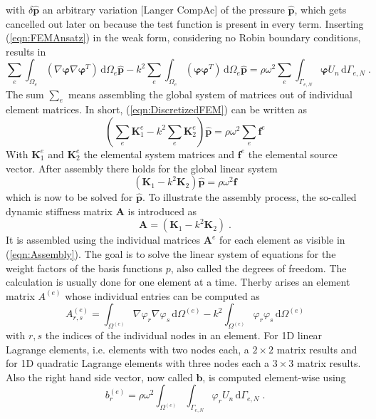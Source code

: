 \documentclass[%
  a4paper,oneside,%
  11pt,%
  smallchapters,
  green,%
  rgb, <cmyk>
  ]{tubsbook}
\begin{document}
with $\delta\hat{\bm{p}}$ an arbitrary variation [Langer CompAc] of the pressure $\hat{\bm{p}}$, which gets cancelled out later on because the test function is present in every term.
Inserting (\ref{eqn:FEMAnsatz}) in the weak form, considering no Robin boundary conditions, results in
\begin{equation}
\sum_e \int_{\Omega_e} (\nabla \bm{\varphi} \nabla \bm{\varphi}^T)\,\mathrm{d}\Omega_e \hat{\bm{p}} -k^2 \sum_e \int_{\Omega_e} (\bm{\varphi} \bm{\varphi}^T)\,\mathrm{d}\Omega_e \hat{\bm{p}} = \rho \omega^2 \sum_e \int_{\Gamma_{e,N}} \bm{\varphi} U_n \,\mathrm{d}\Gamma_{e,N} \;.
\label{eqn:DiscretizedFEM}
\end{equation}
The sum $\sum_e$ means assembling the global system of matrices out of individual element matrices. In short, (\ref{eqn:DiscretizedFEM}) can be written as
\begin{equation}
\left( \sum_e \bm{K}_1^e - k^2 \sum_e \bm{K}_2^e \right)\hat{\bm{p}} = \rho \omega^2 \sum_e \bm{f}^e
\end{equation}
With $\bm{K}_1^e$ and $\bm{K}_2^e$ the elemental system matrices and $\bm{f}^e$ the elemental source vector. After assembly there holds for the global linear system
\begin{equation}
(\bm{K}_1 - k^2 \bm{K}_2) \hat{\bm{p}} = \rho \omega^2 \bm{f}
\end{equation}
which is now to be solved for $\hat{\bm{p}}$.
To illustrate the assembly process, the so-called dynamic stiffness matrix $\bm{A}$ is introduced as
\begin{equation}
\bm{A} = (\bm{K}_1 - k^2 \bm{K}_2) \;.
\end{equation}
It is assembled using the individual matrices $\bm{A}^e$ for each element as visible in (\ref{eqn:Assembly}).
The goal is to solve the linear system of equations for the weight factors of the basis functions $p$, also called the degrees of freedom.
The calculation is usually done for one element at a time. Therby arises an element matrix $A^{(e)}$ whose individual entries can be computed as
\begin{equation}
A_{r,s}^{(e)} = \int_{\Omega^{(e)}} \nabla \varphi_r \nabla \varphi_s \, \mathrm{d}\Omega^{(e)} - k^2 \int_{\Omega^{(e)}} \varphi_r \varphi_s \, \mathrm{d}\Omega^{(e)}
\end{equation}
with $r,s$ the indices of the individual nodes in an element. For 1D linear Lagrange elements, i.e. elements with two nodes each, a $2\times 2$ matrix results and for 1D quadratic Lagrange elements with three nodes each a $3\times3$ matrix results.
%
Also the right hand side vector, now called $\bm{b}$, is computed element-wise using
\begin{equation}
b_r^{(e)} = \rho \omega^2 \int_{\Omega^{(e)}} \int_{\Gamma_{e,N}} \varphi_r U_n \,\mathrm{d}\Gamma_{e,N} \;.
\end{equation}
\end{document}
